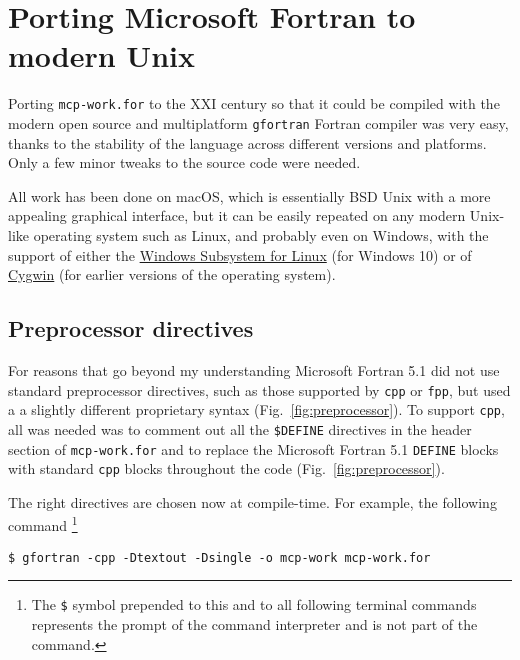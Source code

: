 \section{Porting Microsoft Fortran to modern Unix}

Porting \texttt{mcp-work.for} to the XXI century so that it could be compiled with the modern open source and multiplatform \texttt{gfortran} Fortran compiler was very easy, thanks to the stability of the language across different versions and platforms. Only a few minor tweaks to the source code were needed.

All work has been done on macOS, which is essentially BSD Unix with a more appealing graphical interface, but it can be easily repeated on any modern Unix-like operating system such as Linux, and probably even on Windows, with the support of either the \href{https://docs.microsoft.com/en-us/windows/wsl/}{Windows Subsystem for Linux} (for Windows 10) or of \href{http://www.cygwin.org/}{Cygwin} (for earlier versions of the operating system).



\subsection{Preprocessor directives}

For reasons that go beyond my understanding Microsoft Fortran 5.1 did not use standard preprocessor directives, such as those supported by \texttt{cpp} or \texttt{fpp}, \cite{Boyanski:1992} but used a a slightly different proprietary syntax (Fig.~\ref{fig:preprocessor}). 
To support \texttt{cpp}, all was needed was to comment out all the \texttt{\$DEFINE} directives in the header section of \texttt{mcp-work.for} and to replace the Microsoft Fortran 5.1 \texttt{DEFINE} blocks with standard \texttt{cpp} blocks throughout the code (Fig.~\ref{fig:preprocessor}). 

The right directives are chosen now at compile-time. For example, the following command
\footnote{The \texttt{\$} symbol prepended to this and to all following terminal commands represents the prompt of the command interpreter and is not part of the command.}


\begin{lstlisting}
$ gfortran -cpp -Dtextout -Dsingle -o mcp-work mcp-work.for
\end{lstlisting}

